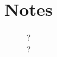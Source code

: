 \documentclass[12pt,reqno]{article}
\title{\bf Notes}
\author{? \\
 {\small ?}}
\affil{}
\date{}
\begin{document}

  



\newpage

% 


\newpage 


\medskip
\printbibliography
\end{document}
